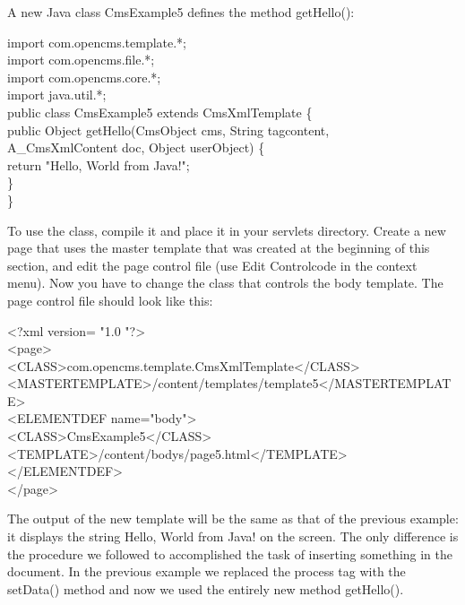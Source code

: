 A new Java class {\class CmsExample5} defines the method {\meth getHello(}):

\begin{xml}
import com.opencms.template.*;\\
import com.opencms.file.*;\\
import com.opencms.core.*;\\


import java.util.*;\\

public class  CmsExample5 extends  CmsXmlTemplate \{\\

\xtabb   public Object getHello(CmsObject cms, String tagcontent,\\
\xtabd           A\_CmsXmlContent doc, Object userObject) \{\\
\xtabc       return "Hello, World from Java!";\\
\xtabb   \}\\

\}\\
\end{xml}

To use the class, compile it and place it in your servlets directory.
Create a new page that uses the master template that was created at the
beginning of this section, and edit the page control file (use {\name Edit
Controlcode} in the context menu). Now you have to change the class
that controls the body template. The page {\name control file} should look like
this:

\begin{xml}
<?xml version= "1.0 "?>\\
<page>\\
\xtaba <CLASS>com.opencms.template.CmsXmlTemplate</CLASS>\\
\xtaba <MASTERTEMPLATE>/content/templates/template5</MASTERTEMPLATE>\\
\xtaba <ELEMENTDEF name="body">\\
\xtaba <CLASS>CmsExample5</CLASS>\\
\xtaba <TEMPLATE>/content/bodys/page5.html</TEMPLATE>\\
\xtaba </ELEMENTDEF>\\
</page>\\
\end{xml}

The output of the new template will be the same as that of the previous
example: it displays the string {\name Hello, World from Java!} on the screen.
The only difference is the procedure we followed to accomplished the
task of inserting something in the document. In the previous example we
replaced the process tag with the {\meth setData()} method and now we used the
entirely new method {\meth getHello()}.

